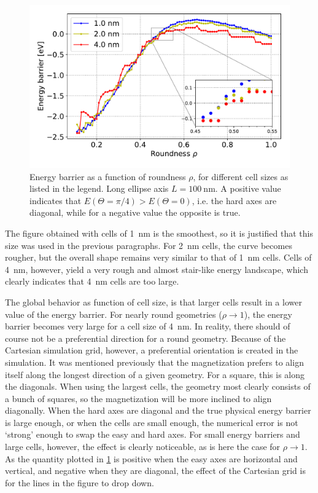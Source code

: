 \documentclass[11pt,a4paper,english]{article}
\begin{document}
\begin{figure}
    \centering
    \includegraphics[width=0.9\columnwidth]{Figures/biaxial_island/Barrier/Plus_100_0.1-1_aPi128_B0.01_cell1,2,4nm.pdf}
    \caption{Energy barrier as a function of roundness $\rho$, for different cell sizes as listed in the legend. Long ellipse axis $L=\SI{100}{\nano\metre}$. A positive value indicates that $E(\Theta=\pi/4) > E(\Theta=0)$, i.e. the hard axes are diagonal, while for a negative value the opposite is true.}
    \label{fig:barrier-cell_size-100nm}
\end{figure}
The figure obtained with cells of \SI{1}{\nano\metre} is the smoothest, so it is justified that this size was used in the previous paragraphs. For \SI{2}{\nano\metre} cells, the curve becomes rougher, but the overall shape remains very similar to that of \SI{1}{\nano\metre} cells. Cells of \SI{4}{\nano\metre}, however, yield a very rough and almost stair-like energy landscape, which clearly indicates that \SI{4}{\nano\metre} cells are too large. \par
The global behavior as function of cell size, is that larger cells result in a lower value of the energy barrier. For nearly round geometries ($\rho \rightarrow 1$), the energy barrier becomes very large for a cell size of \SI{4}{\nano\metre}. In reality, there should of course not be a preferential direction for a round geometry. Because of the Cartesian simulation grid, however, a preferential orientation is created in the simulation. It was mentioned previously that the magnetization prefers to align itself along the longest direction of a given geometry. For a square, this is along the diagonals. When using the largest cells, the geometry most clearly consists of a bunch of squares, so the magnetization will be more inclined to align diagonally. When the hard axes are diagonal and the true physical energy barrier is large enough, or when the cells are small enough, the numerical error is not `strong' enough to swap the easy and hard axes. For small energy barriers and large cells, however, the effect is clearly noticeable, as is here the case for $\rho \rightarrow 1$. As the quantity plotted in \cref{fig:barrier-cell_size-100nm} is positive when the easy axes are horizontal and vertical, and negative when they are diagonal, the effect of the Cartesian grid is for the lines in the figure to drop down. \par
\end{document}
